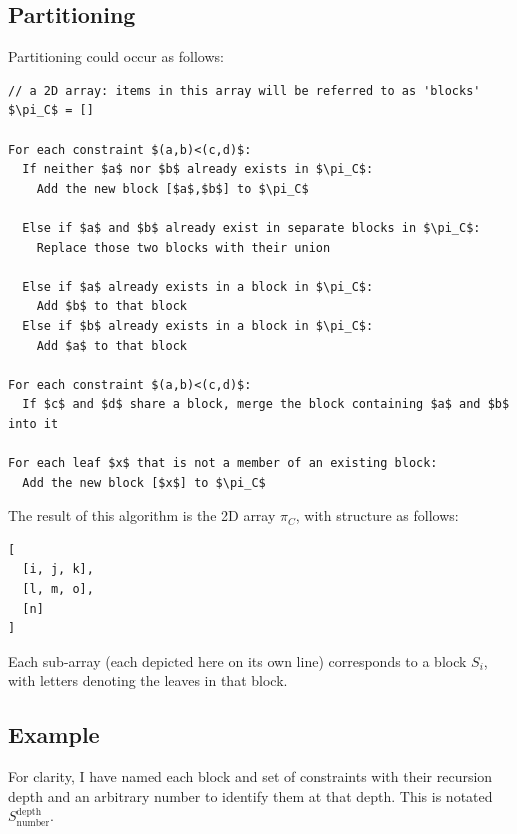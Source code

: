 \documentclass[11pt]{article} %
\renewcommand{\thesubsubsection}{}
\begin{document}
\subsection{Partitioning}
Partitioning could occur as follows:
\begin{lstlisting}
// a 2D array: items in this array will be referred to as 'blocks'
$\pi_C$ = []

For each constraint $(a,b)<(c,d)$:
  If neither $a$ nor $b$ already exists in $\pi_C$:
    Add the new block [$a$,$b$] to $\pi_C$

  Else if $a$ and $b$ already exist in separate blocks in $\pi_C$:
    Replace those two blocks with their union

  Else if $a$ already exists in a block in $\pi_C$:
    Add $b$ to that block
  Else if $b$ already exists in a block in $\pi_C$:
    Add $a$ to that block

For each constraint $(a,b)<(c,d)$:
  If $c$ and $d$ share a block, merge the block containing $a$ and $b$ into it

For each leaf $x$ that is not a member of an existing block:
  Add the new block [$x$] to $\pi_C$
\end{lstlisting}

The result of this algorithm is the 2D array $\pi_C$, with structure as follows:
\begin{lstlisting}
[
  [i, j, k],
  [l, m, o],
  [n]
]
\end{lstlisting}
Each sub-array (each depicted here on its own line) corresponds to a block $S_i$, with letters denoting the leaves in that block.


\subsection{Example}
For clarity, I have named each block and set of constraints with their recursion depth and an arbitrary number to identify them at that depth. This is notated $S_\text{number}^\text{depth}$.

\setcounter{subsubsection}{-1}
\renewcommand{\thesubsubsection}{Recursion depth \arabic{subsubsection}}
\end{document}
